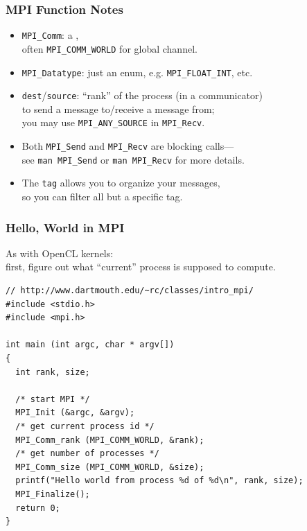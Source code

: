 \begin{frame}
  \frametitle{MPI Function Notes}
  

  \begin{itemize}
    \item {\tt MPI\_Comm}: a , \\
      \qquad often {\tt MPI\_COMM\_WORLD} for global channel.
    \item {\tt MPI\_Datatype}: just an enum, e.g. {\tt MPI\_FLOAT\_INT}, etc.\\[1em]


    \item {\tt dest}/{\tt source}: ``rank'' of the process (in a communicator) \\
      to send a
      message to/receive a message from;\\
        \qquad you may use {\tt MPI\_ANY\_SOURCE} in {\tt MPI\_Recv}.\\[1em]

    \item Both {\tt MPI\_Send} and {\tt MPI\_Recv} are blocking calls---\\
      \qquad see {\tt man MPI\_Send} or {\tt man MPI\_Recv} for more details.

    \item The {\tt tag} allows you to organize your messages, \\ \qquad so you can
      filter all but a specific tag.
  \end{itemize}
  
\end{frame}

\begin{frame}[fragile]
  \frametitle{Hello, World in MPI}
  
As with OpenCL kernels:\\
\quad first, figure out what ``current'' process is supposed to compute.\\

{\small
\begin{verbatim}
// http://www.dartmouth.edu/~rc/classes/intro_mpi/
#include <stdio.h>
#include <mpi.h>

int main (int argc, char * argv[])
{
  int rank, size;

  /* start MPI */
  MPI_Init (&argc, &argv);	
  /* get current process id */
  MPI_Comm_rank (MPI_COMM_WORLD, &rank);	
  /* get number of processes */
  MPI_Comm_size (MPI_COMM_WORLD, &size);	
  printf("Hello world from process %d of %d\n", rank, size);
  MPI_Finalize();
  return 0;
}
\end{verbatim}
}
  
\end{frame}

